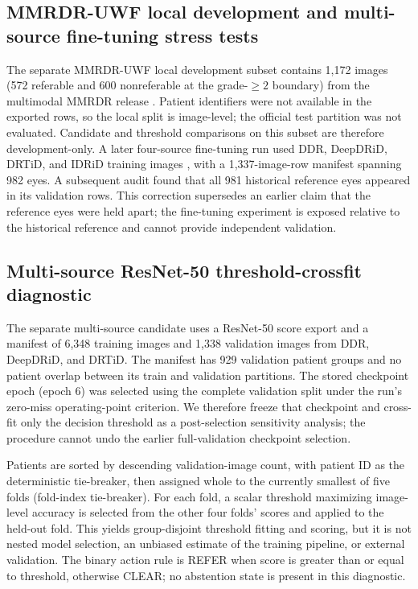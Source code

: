 \documentclass[11pt]{article}
\begin{document}
\subsection{MMRDR-UWF local development and multi-source fine-tuning stress tests}
The separate MMRDR-UWF local development subset contains 1,172 images (572 referable and 600 nonreferable at the grade-$\geq2$ boundary) from the multimodal MMRDR release \cite{mmrdr}. Patient identifiers were not available in the exported rows, so the local split is image-level; the official test partition was not evaluated. Candidate and threshold comparisons on this subset are therefore development-only. A later four-source fine-tuning run used DDR, DeepDRiD, DRTiD, and IDRiD training images \cite{idrid}, with a 1,337-image-row manifest spanning 982 eyes. A subsequent audit found that all 981 historical reference eyes appeared in its validation rows. This correction supersedes an earlier claim that the reference eyes were held apart; the fine-tuning experiment is exposed relative to the historical reference and cannot provide independent validation.

\subsection{Multi-source ResNet-50 threshold-crossfit diagnostic}
The separate multi-source candidate uses a ResNet-50 score export and a manifest of 6,348 training images and 1,338 validation images from DDR, DeepDRiD, and DRTiD. The manifest has 929 validation patient groups and no patient overlap between its train and validation partitions. The stored checkpoint epoch (epoch 6) was selected using the complete validation split under the run's zero-miss operating-point criterion. We therefore freeze that checkpoint and cross-fit only the decision threshold as a post-selection sensitivity analysis; the procedure cannot undo the earlier full-validation checkpoint selection.

Patients are sorted by descending validation-image count, with patient ID as the deterministic tie-breaker, then assigned whole to the currently smallest of five folds (fold-index tie-breaker). For each fold, a scalar threshold maximizing image-level accuracy is selected from the other four folds' scores and applied to the held-out fold. This yields group-disjoint threshold fitting and scoring, but it is not nested model selection, an unbiased estimate of the training pipeline, or external validation. The binary action rule is REFER when score is greater than or equal to threshold, otherwise CLEAR; no abstention state is present in this diagnostic.
\end{document}
